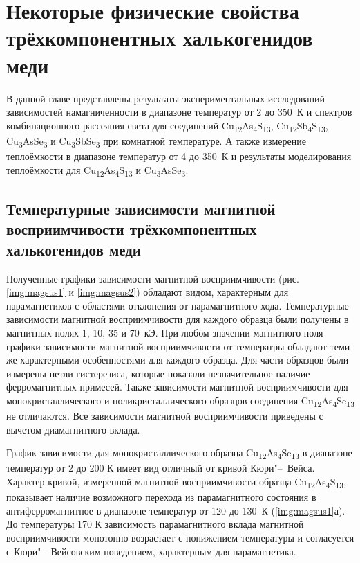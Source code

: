 \chapter{Некоторые физические свойства трёхкомпонентных халькогенидов меди} \label{chapt4}
В данной главе представлены результаты экспериментальных исследований зависимостей намагниченности в диапазоне температур от 2 до 350~К и спектров комбинационного рассеяния света для соединений Cu\textsubscript{12}As\textsubscript{4}S\textsubscript{13}, Cu\textsubscript{12}Sb\textsubscript{4}S\textsubscript{13}, Cu\textsubscript{3}AsSe\textsubscript{3} и Cu\textsubscript{3}SbSe\textsubscript{3} при комнатной температуре. А также измерение теплоёмкости в диапазоне температур от 4 до 350~К и результаты моделирования теплоёмкости для Cu\textsubscript{12}As\textsubscript{4}S\textsubscript{13} и Cu\textsubscript{3}AsSe\textsubscript{3}.

\section{Температурные зависимости магнитной восприимчивости трёхкомпонентных халькогенидов меди} \label{sect4_1}

Полученные графики зависимости магнитной восприимчивости (рис. \ref{img:magsus1} и \ref{img:magsus2}) обладают видом, характерным для парамагнетиков с областями отклонения от парамагнитного хода.  Температурные зависимости магнитной восприимчивости для каждого образца были получены в магнитных полях 1, 10, 35 и 70~кЭ. При любом значении магнитного поля графики зависимости магнитной восприимчивости от температры обладают теми же характерными особенностями для каждого образца. Для части образцов были измерены петли гистерезиса, которые показали незначительное наличие ферромагнитных примесей. Также зависимости магнитной восприимчивости для монокристаллического и поликристаллического образцов соединения Cu\textsubscript{12}As\textsubscript{4}Se\textsubscript{13} не отличаются. Все зависимости магнитной восприимчивости приведены с вычетом диамагнитного вклада.

График зависимости для монокристаллического образца Cu\textsubscript{12}As\textsubscript{4}Se\textsubscript{13} в диапазоне температур от 2 до 200 К имеет вид отличный от кривой Кюри"--~Вейса.
 Характер кривой, измеренной магнитной восприимчивости образца  Cu\textsubscript{12}As\textsubscript{4}S\textsubscript{13}, показывает наличие возможного перехода из парамагнитного состояния в антиферромагнитное в диапазоне температур от 120 до 130~К (\ref{img:magsus1}а).
До температуры 170 К зависимость парамагнитного вклада магнитной восприимчивости монотонно возрастает с понижением температуры и согласуется с Кюри"--~Вейсовским поведением, характерным для парамагнетика.

